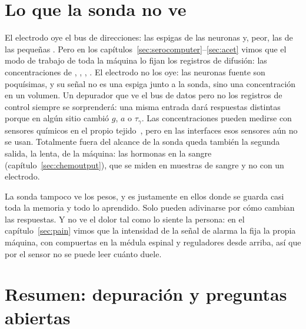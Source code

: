 \section{Lo que la sonda no ve}

El electrodo oye el bus de direcciones: las espigas de las neuronas  y, peor, las de las pequeñas . Pero en los capítulos~\ref{sec:serocomputer}--\ref{sec:acet} vimos que el modo de trabajo de toda la máquina lo fijan los registros de difusión: las concentraciones de , , , . El electrodo no los oye: las neuronas fuente son poquísimas, y su señal no es una espiga junto a la sonda, sino una concentración en un volumen. Un depurador que ve el bus de datos pero no los registros de control siempre se sorprenderá: una misma entrada dará respuestas distintas porque en algún sitio cambió $g$, $a$ o $\tau_\gamma$. Las concentraciones pueden medirse con sensores químicos en el propio tejido~\cite{Bunin1998}, pero en las interfaces esos sensores aún no se usan. Totalmente fuera del alcance de la sonda queda también la segunda salida, la lenta, de la máquina: las hormonas en la sangre (capítulo~\ref{sec:chemoutput}), que se miden en muestras de sangre y no con un electrodo.

La sonda tampoco ve los pesos, y es justamente en ellos donde se guarda casi toda la memoria y todo lo aprendido. Solo pueden adivinarse por cómo cambian las respuestas. Y no ve el dolor tal como lo siente la persona: en el capítulo~\ref{sec:pain} vimos que la intensidad de la señal de alarma la fija la propia máquina, con compuertas en la médula espinal y reguladores desde arriba, así que por el sensor no se puede leer cuánto duele.

\section{Resumen: depuración y preguntas abiertas}

